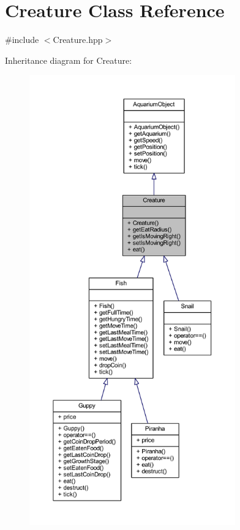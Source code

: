 \hypertarget{class_creature}{}\section{Creature Class Reference}
\label{class_creature}


{\ttfamily \#include $<$Creature.\+hpp$>$}



Inheritance diagram for Creature\+:\nopagebreak
\begin{figure}[H]
\begin{center}
\leavevmode
\includegraphics[height=550pt]{class_creature__inherit__graph}
\end{center}
\end{figure}


